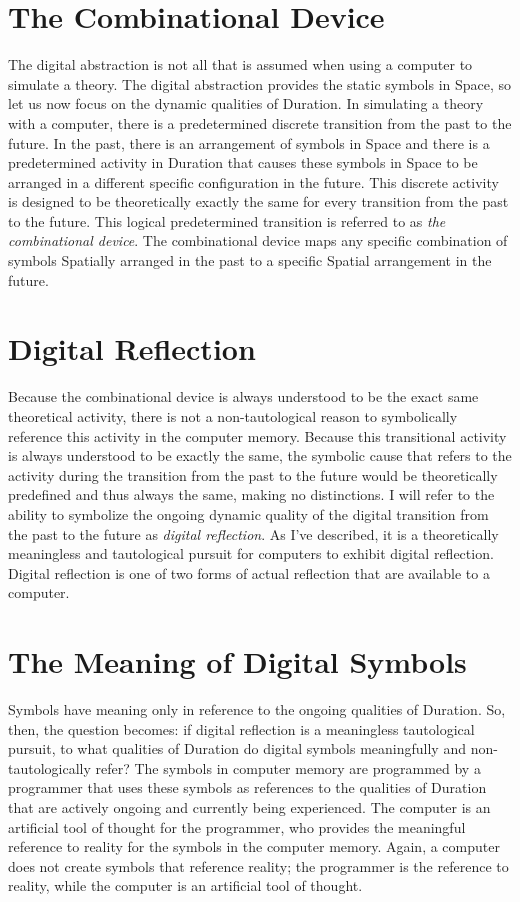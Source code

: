 \section{The Combinational Device}

The digital abstraction is not all that is assumed when using a
computer to simulate a theory.  The digital abstraction provides the
static symbols in Space, so let us now focus on the dynamic qualities
of Duration.  In simulating a theory with a computer, there is a
predetermined discrete transition from the past to the future.  In the
past, there is an arrangement of symbols in Space and there is a
predetermined activity in Duration that causes these symbols in Space
to be arranged in a different specific configuration in the future.
This discrete activity is designed to be theoretically exactly the
same for every transition from the past to the future.  This logical
predetermined transition is referred to as \emph{the combinational
  device}.  The combinational device maps any specific combination of
symbols Spatially arranged in the past to a specific Spatial
arrangement in the future.

\section{Digital Reflection}

Because the combinational device is always understood to be the exact
same theoretical activity, there is not a non-tautological reason to
symbolically reference this activity in the computer memory.  Because
this transitional activity is always understood to be exactly the
same, the symbolic cause that refers to the activity during the
transition from the past to the future would be theoretically
predefined and thus always the same, making no distinctions.  I will
refer to the ability to symbolize the ongoing dynamic quality of the
digital transition from the past to the future as \emph{digital
  reflection}.  As I've described, it is a theoretically meaningless
and tautological pursuit for computers to exhibit digital reflection.
Digital reflection is one of two forms of actual reflection that are
available to a computer.

\section{The Meaning of Digital Symbols}

Symbols have meaning only in reference to the ongoing qualities of
Duration.  So, then, the question becomes: if digital reflection is a
meaningless tautological pursuit, to what qualities of Duration do
digital symbols meaningfully and non-tautologically refer?  The
symbols in computer memory are programmed by a programmer that uses
these symbols as references to the qualities of Duration that are
actively ongoing and currently being experienced.  The computer is an
artificial tool of thought for the programmer, who provides the
meaningful reference to reality for the symbols in the computer
memory.  Again, a computer does not create symbols that reference
reality; the programmer is the reference to reality, while the
computer is an artificial tool of thought.

